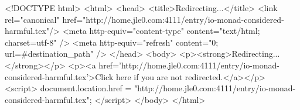 <!DOCTYPE html>
<html>
<head>
<title>Redirecting...</title>
<link rel="canonical" href="http://home.jle0.com:4111/entry/io-monad-considered-harmful.tex"/>
<meta http-equiv="content-type" content="text/html; charset=utf-8" />
<meta http-equiv="refresh" content="0; url=#{destination_path}" />
</head>
<body>
  <p><strong>Redirecting...</strong></p>
  <p><a href='http://home.jle0.com:4111/entry/io-monad-considered-harmful.tex'>Click here if you are not redirected.</a></p>
  <script>
    document.location.href = "http://home.jle0.com:4111/entry/io-monad-considered-harmful.tex";
  </script>
</body>
</html>

